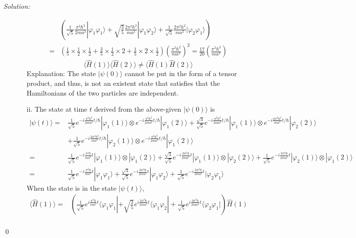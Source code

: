 \documentclass[12pt,a4paper]{article}
\newenvironment{sol}
    {\emph{Solution:}
    }
    {
    \qed
    }
\begin{document}
\begin{sol}
\begin{itemize}
\begin{itemize}
\begin{align}
\nonumber&\left(\frac{1}{\sqrt{5}}\frac{\pi^2\hbar^2}{2ma^2}|\varphi_1\varphi_1\rangle+\sqrt{\frac{3}{5}}\frac{2\pi^2\hbar^2}{ma^2}|\varphi_1\varphi_2\rangle+\frac{1}{\sqrt{5}}\frac{2\pi^2\hbar^2}{ma^2}|\varphi_2\varphi_1\rangle\right)\\
=&\left(\frac{1}{5}\times\frac{1}{2}\times\frac{1}{2}+\frac{3}{5}\times\frac{1}{2}\times2+\frac{1}{5}\times2\times\frac{1}{2}\right)\left(\frac{\pi^2\hbar^2}{ma^2}\right)^2=\frac{17}{20}\left(\frac{\pi^2\hbar^2}{ma^2}\right)
\end{align}
\begin{equation}
\langle\hat{H}(1)\rangle\langle\hat{H}(2)\rangle\neq\langle\hat{H}(1)\hat{H}(2)\rangle
\end{equation}
Explanation: The state $|\psi(0)\rangle$ cannot be put in the form of a tensor product, and thus, is not an existent state that satisfies that the Hamiltonians of the two particles are independent.
\item[ii.] The state at time $t$ derived from the above-given $|\psi(0)\rangle$ is
\small\begin{align}
\nonumber|\psi(t)\rangle=&\frac{1}{\sqrt{5}}e^{-i\frac{\pi^2\hbar^2}{2ma^2}t/\hbar}|\varphi_1(1)\rangle\otimes e^{-i\frac{\pi^2\hbar^2}{2ma^2}t/\hbar}|\varphi_1(2)\rangle+\frac{\sqrt{3}}{\sqrt{5}}e^{-i\frac{\pi^2\hbar^2}{2ma^2}t/\hbar}|\varphi_1(1)\rangle\otimes e^{-i\frac{2\pi^2\hbar^2}{ma^2}t/\hbar}|\varphi_2(2)\rangle\\
\nonumber&+\frac{1}{\sqrt{5}}e^{-i\frac{2\pi^2\hbar^2}{ma^2}t/\hbar}|\varphi_2(1)\rangle\otimes e^{-i\frac{\pi^2\hbar^2}{2ma^2}t/\hbar}|\varphi_1(2)\rangle\\
\nonumber=&\frac{1}{\sqrt{5}}e^{-i\frac{\pi^2\hbar}{ma^2}t}|\varphi_1(1)\rangle\otimes|\varphi_1(2)\rangle+\frac{\sqrt{3}}{\sqrt{5}}e^{-i\frac{3\pi^2\hbar}{2ma^2}t}|\varphi_1(1)\rangle\otimes|\varphi_2(2)\rangle+\frac{1}{\sqrt{5}}e^{-i\frac{3\pi^2\hbar}{2ma^2}t}|\varphi_2(1)\rangle\otimes|\varphi_1(2)\rangle\\
=&\frac{1}{\sqrt{5}}e^{-i\frac{\pi^2\hbar}{ma^2}t}|\varphi_1\varphi_1\rangle+\frac{\sqrt{3}}{\sqrt{5}}e^{-i\frac{3\pi^2\hbar}{2ma^2}t}|\varphi_1\varphi_2\rangle+\frac{1}{\sqrt{5}}e^{-i\frac{3\pi^2\hbar}{2ma^2}t}|\varphi_2\varphi_1\rangle
\end{align}\normalsize
When the state is in the state $|\psi(t)\rangle$,
\small\begin{align}
\nonumber\langle\hat{H}(1)\rangle=&\left(\frac{1}{\sqrt{5}}e^{i\frac{\pi^2\hbar}{ma^2}t}\langle\varphi_1\varphi_1|+\sqrt{\frac{3}{5}}e^{i\frac{3\pi^2\hbar}{2ma^2}t}\langle\varphi_1\varphi_2|+\frac{1}{\sqrt{5}}e^{i\frac{3\pi^2\hbar}{2ma^2}t}\langle\varphi_2\varphi_1|\right)\hat{H}(1)\\

\end{align}
\end{itemize}
\end{itemize}
\end{sol}
\end{document}
